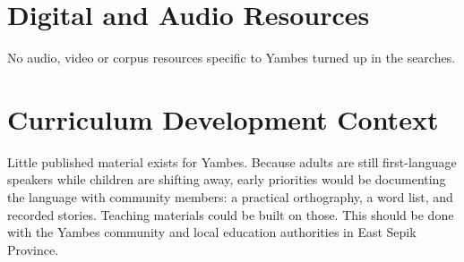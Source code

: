 \documentclass[12pt]{article}
\begin{document}
\section{Digital and Audio Resources}
No audio, video or corpus resources specific to Yambes turned up in the searches.

\section{Curriculum Development Context}
Little published material exists for Yambes. Because adults are still first-language speakers while children are shifting away, early priorities would be documenting the language with community members: a practical orthography, a word list, and recorded stories. Teaching materials could be built on those. This should be done with the Yambes community and local education authorities in East Sepik Province.
\end{document}
